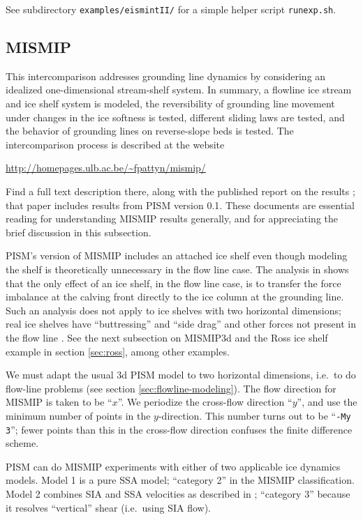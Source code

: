 See subdirectory \verb|examples/eismintII/| for a simple helper script \verb|runexp.sh|.


\subsection{MISMIP}\label{subsect:MISMIP}

This intercomparison addresses grounding line dynamics by considering an idealized one-dimensional stream-shelf system.  In summary, a flowline ice stream and ice shelf system is modeled, the reversibility of grounding line movement under changes in the ice softness is tested, different sliding laws are tested, and the behavior of grounding lines on reverse-slope beds is tested.  The intercomparison process is described at the website

\centerline{\url{http://homepages.ulb.ac.be/~fpattyn/mismip/}}

\noindent Find a full text description there, along with the published report on the results \cite{MISMIP2012}; that paper includes results from PISM version 0.1.  These documents are essential reading for understanding MISMIP results generally, and for appreciating the brief discussion in this subsection.

PISM's version of MISMIP includes an attached ice shelf even though modeling the shelf is theoretically unnecessary in the flow line case.  The analysis in \cite{SchoofMarine1} shows that the only effect of an ice shelf, in the flow line case, is to transfer the force imbalance at the calving front directly to the ice column at the grounding line.  Such an analysis does not apply to ice shelves with two horizontal dimensions; real ice shelves have ``buttressing'' and ``side drag'' and other forces not present in the flow line \cite{Goldbergetal2009}.  See the next subsection on MISMIP3d and the Ross ice shelf example in section \ref{sec:ross}, among other examples.

We must adapt the usual 3d PISM model to two horizontal dimensions, i.e.~to do flow-line problems (see section \ref{sec:flowline-modeling}).  The flow direction for MISMIP is taken to be ``$x$''.  We periodize the cross-flow direction ``$y$'', and use the minimum number of points in the $y$-direction.  This number turns out to be ``\texttt{-My 3}''; fewer points than this in the cross-flow direction confuses the finite difference scheme.

PISM can do MISMIP experiments with either of two applicable ice dynamics models.  Model 1 is a pure SSA model; ``category 2'' in the MISMIP classification.  Model 2 combines SIA and SSA velocities as described in \cite{Winkelmannetal2011}; ``category 3'' because it resolves ``vertical'' shear (i.e.~using SIA flow).

